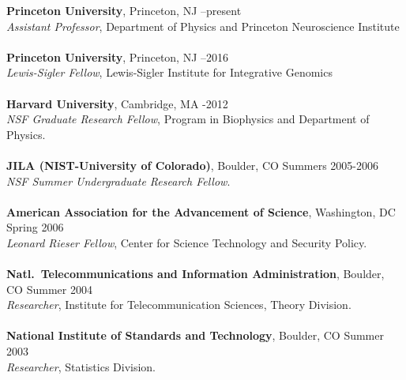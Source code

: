 \documentclass[11pt]{article}
\makeatletter
\renewcommand{\section}{\@startsection
{section}%
{1}%
{0mm}%
{2\baselineskip}%
{0.5\baselineskip}%
{\normalfont\bf\MakeUppercase}} %
\makeatother
\begin{document}
{\bf Princeton University}, Princeton, NJ  --present\\
{\it Assistant Professor}, Department of Physics and Princeton
Neuroscience Institute\\ 
\\
{\bf Princeton University}, Princeton, NJ  --2016\\
{\it Lewis-Sigler Fellow}, Lewis-Sigler Institute for Integrative Genomics\\ 
\\
{\bf Harvard University}, 
Cambridge, MA  -2012\\
{\it NSF Graduate Research Fellow}, Program in Biophysics and Department of Physics.\\
\\
{\bf JILA (NIST-University of Colorado)}, Boulder, CO   \dotfill Summers 2005-2006\\
{\it NSF Summer Undergraduate Research Fellow}.\\
\\
{\bf American Association for the Advancement of Science}, Washington, DC  \dotfill Spring 2006\\
{\it Leonard Rieser Fellow}, Center for Science Technology and Security Policy.\\
\\
{\bf Natl.~Telecommunications and Information Administration}, Boulder, CO  \dotfill Summer 2004\\
{\it Researcher}, Institute for Telecommunication Sciences, Theory Division.\\
\\
{\bf National Institute of Standards and Technology}, Boulder, CO  \dotfill Summer 2003\\
{\it Researcher}, Statistics Division.\\
\end{document}
